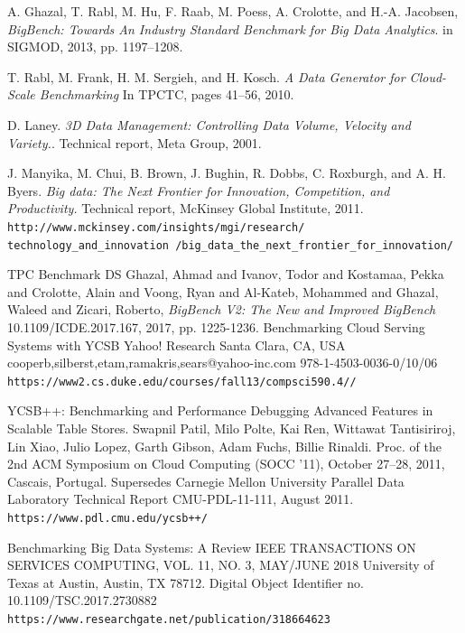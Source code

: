 \documentclass[sigconf,10pt]{acmart}
\begin{document}
\begin{thebibliography}{9}
A. Ghazal, T. Rabl, M. Hu, F. Raab, M. Poess, A. Crolotte, and H.-A. Jacobsen, 
\textit{BigBench: Towards An Industry Standard Benchmark for Big Data Analytics}.
in SIGMOD, 2013, pp. 1197–1208.

T. Rabl, M. Frank, H. M. Sergieh, and H. Kosch. 
\textit{A Data Generator for Cloud-Scale Benchmarking} In TPCTC, pages 41–56, 2010.

D. Laney.
\textit{3D Data Management: Controlling Data Volume, Velocity and Variety.}.
Technical report, Meta Group, 2001.

J. Manyika, M. Chui, B. Brown, J. Bughin, R. Dobbs, C. Roxburgh, and A. H. Byers. 
\textit{Big data: The Next Frontier for Innovation, Competition, and Productivity.} Technical report, McKinsey Global Institute, 2011.
\\\texttt{http://www.mckinsey.com/insights/mgi/research/
technology\_and\_innovation
/big\_data\_the\_next\_frontier\_for\_innovation/}

TPC Benchmark DS
Ghazal, Ahmad and Ivanov, Todor and Kostamaa, Pekka and Crolotte, Alain and Voong, Ryan and Al-Kateb, Mohammed and Ghazal, Waleed and Zicari, Roberto,
\textit{BigBench V2: The New and Improved BigBench}
10.1109/ICDE.2017.167, 2017, pp. 1225-1236.
Benchmarking Cloud Serving Systems with YCSB
Yahoo! Research
Santa Clara, CA, USA
{cooperb,silberst,etam,ramakris,sears}@yahoo-inc.com
978-1-4503-0036-0/10/06
 \\\texttt{https://www2.cs.duke.edu/courses/fall13/compsci590.4//}

YCSB++: Benchmarking and Performance Debugging Advanced Features in Scalable Table Stores. Swapnil Patil, Milo Polte, Kai Ren, Wittawat Tantisiriroj, Lin Xiao, Julio Lopez, Garth Gibson, Adam Fuchs, Billie Rinaldi. Proc. of the 2nd ACM Symposium on Cloud Computing (SOCC '11), October 27–28, 2011, Cascais, Portugal. Supersedes Carnegie Mellon University Parallel Data Laboratory Technical Report CMU-PDL-11-111, August 2011. \\\texttt{https://www.pdl.cmu.edu/ycsb++/}

Benchmarking Big Data Systems: A Review IEEE  TRANSACTIONS ON SERVICES COMPUTING, VOL. 11, NO. 3, MAY/JUNE 2018
University of Texas at Austin, Austin, TX 78712.
Digital Object Identiﬁer no. 10.1109/TSC.2017.2730882
 \\\texttt{https://www.researchgate.net/publication/318664623}

\end{thebibliography}
\end{document}
